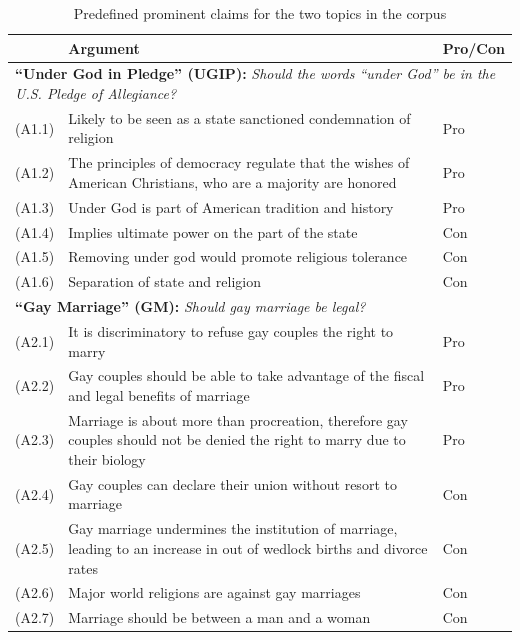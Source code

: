 \begin{table}[t]
\centering
{\small
\begin{tabular}{lp{12cm}l}
\toprule
& Argument & Pro/Con\\
\midrule
\multicolumn{3}{p{13cm}}{\textbf{``Under God in Pledge'' (UGIP):} \emph{Should
the words ``under God'' be in the U.S. Pledge of Allegiance? }}\\
(A1.1) & \normalsize{Likely to be seen as a state sanctioned condemnation of religion}  &  Pro \\
(A1.2) & \normalsize{The principles of democracy regulate that the wishes of American Christians,
     who are a majority are honored} & Pro \\
(A1.3) & \normalsize{Under God is part of American tradition and history} & Pro  \\  
(A1.4) & \normalsize{Implies ultimate power on the part of the state} &   Con \\  
(A1.5) & \normalsize{Removing under god would promote religious tolerance} & Con \\  
(A1.6) & \normalsize{Separation of state and religion} & Con \\
\midrule
\multicolumn{3}{l}{\textbf{``Gay Marriage'' (GM):} \emph{Should gay marriage be legal?}}\\
(A2.1) & \normalsize{It is discriminatory to refuse gay couples the right to marry} & Pro \\
(A2.2) & \normalsize{Gay couples should be able to take advantage of the fiscal and legal
benefits of marriage} & Pro \\
(A2.3) & \normalsize{Marriage is about more than procreation, therefore gay couples should not 
be denied the right to marry due to their biology} & Pro\\
(A2.4) & \normalsize{Gay couples can declare their union without resort to marriage} & Con \\
(A2.5) & \normalsize{Gay marriage undermines the institution of marriage, leading to an increase
in out of wedlock births and divorce rates} & Con \\
(A2.6) & \normalsize{Major world religions are against gay marriages} & Con \\
(A2.7) & \normalsize{Marriage should be between a man and a woman} & Con \\
\bottomrule
\end{tabular}
}
\caption{Predefined prominent claims for the two topics in the \ComArg corpus}
\label{tab:comarg-claims}
\end{table}


